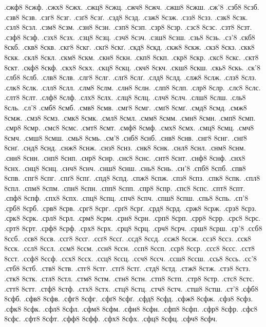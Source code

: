 {.сжф8 8сжф.
.сжх8 8сжх.
.сжц8 8сжц.
.сжч8 8сжч.
.сжш8 8сжш.
.сж'8
.сзб8 8сзб.
.сзв8 8сзв.
.сзг8 8сзг.
.сзґ8 8сзґ.
.сзд8 8сзд.
.сзж8 8сзж.
.сзз8 8сзз.
.сзк8 8сзк.
.сзл8 8сзл.
.сзм8 8сзм.
.сзн8 8сзн.
.сзп8 8сзп.
.сзр8 8сзр.
.сзс8 8сзс.
.сзт8 8сзт.
.сзф8 8сзф.
.сзх8 8сзх.
.сзц8 8сзц.
.сзч8 8сзч.
.сзш8 8сзш.
.сзь8 8сзь.
.сз'8
.скб8 8скб.
.скв8 8скв.
.скг8 8скг.
.скґ8 8скґ.
.скд8 8скд.
.скж8 8скж.
.скз8 8скз.
.скк8 8скк.
.скл8 8скл.
.скм8 8скм.
.скн8 8скн.
.скп8 8скп.
.скр8 8скр.
.скс8 8скс.
.скт8 8скт.
.скф8 8скф.
.скх8 8скх.
.скц8 8скц.
.скч8 8скч.
.скш8 8скш.
.скь8 8скь.
.ск'8
.слб8 8слб.
.слв8 8слв.
.слг8 8слг.
.слґ8 8слґ.
.слд8 8слд.
.слж8 8слж.
.слз8 8слз.
.слк8 8слк.
.слл8 8слл.
.слм8 8слм.
.слн8 8слн.
.слп8 8слп.
.слр8 8слр.
.слс8 8слс.
.слт8 8слт.
.слф8 8слф.
.слх8 8слх.
.слц8 8слц.
.слч8 8слч.
.слш8 8слш.
.сль8 8сль.
.сл'8
.смб8 8смб.
.смв8 8смв.
.смг8 8смг.
.смґ8 8смґ.
.смд8 8смд.
.смж8 8смж.
.смз8 8смз.
.смк8 8смк.
.смл8 8смл.
.смм8 8смм.
.смн8 8смн.
.смп8 8смп.
.смр8 8смр.
.смс8 8смс.
.смт8 8смт.
.смф8 8смф.
.смх8 8смх.
.смц8 8смц.
.смч8 8смч.
.смш8 8смш.
.смь8 8смь.
.см'8
.снб8 8снб.
.снв8 8снв.
.снг8 8снг.
.снґ8 8снґ.
.снд8 8снд.
.снж8 8снж.
.снз8 8снз.
.снк8 8снк.
.снл8 8снл.
.снм8 8снм.
.снн8 8снн.
.снп8 8снп.
.снр8 8снр.
.снс8 8снс.
.снт8 8снт.
.снф8 8снф.
.снх8 8снх.
.снц8 8снц.
.снч8 8снч.
.снш8 8снш.
.снь8 8снь.
.сн'8
.спб8 8спб.
.спв8 8спв.
.спг8 8спг.
.спґ8 8спґ.
.спд8 8спд.
.спж8 8спж.
.спз8 8спз.
.спк8 8спк.
.спл8 8спл.
.спм8 8спм.
.спн8 8спн.
.спп8 8спп.
.спр8 8спр.
.спс8 8спс.
.спт8 8спт.
.спф8 8спф.
.спх8 8спх.
.спц8 8спц.
.спч8 8спч.
.спш8 8спш.
.спь8 8спь.
.сп'8
.срб8 8срб.
.срв8 8срв.
.срг8 8срг.
.срґ8 8срґ.
.срд8 8срд.
.срж8 8срж.
.срз8 8срз.
.срк8 8срк.
.срл8 8срл.
.срм8 8срм.
.срн8 8срн.
.срп8 8срп.
.срр8 8срр.
.срс8 8срс.
.срт8 8срт.
.срф8 8срф.
.срх8 8срх.
.срц8 8срц.
.срч8 8срч.
.срш8 8срш.
.ср'8
.ссб8 8ссб.
.ссв8 8ссв.
.ссг8 8ссг.
.ссґ8 8ссґ.
.ссд8 8ссд.
.ссж8 8ссж.
.ссз8 8ссз.
.сск8 8сск.
.ссл8 8ссл.
.ссм8 8ссм.
.ссн8 8ссн.
.ссп8 8ссп.
.сср8 8сср.
.ссс8 8ссс.
.сст8 8сст.
.ссф8 8ссф.
.ссх8 8ссх.
.ссц8 8ссц.
.ссч8 8ссч.
.ссш8 8ссш.
.ссь8 8ссь.
.сс'8
.стб8 8стб.
.ств8 8ств.
.стг8 8стг.
.стґ8 8стґ.
.стд8 8стд.
.стж8 8стж.
.стз8 8стз.
.стк8 8стк.
.стл8 8стл.
.стм8 8стм.
.стн8 8стн.
.стп8 8стп.
.стр8 8стр.
.стс8 8стс.
.стт8 8стт.
.стф8 8стф.
.стх8 8стх.
.стц8 8стц.
.стч8 8стч.
.стш8 8стш.
.ст'8
.сфб8 8сфб.
.сфв8 8сфв.
.сфг8 8сфг.
.сфґ8 8сфґ.
.сфд8 8сфд.
.сфж8 8сфж.
.сфз8 8сфз.
.сфк8 8сфк.
.сфл8 8сфл.
.сфм8 8сфм.
.сфн8 8сфн.
.сфп8 8сфп.
.сфр8 8сфр.
.сфс8 8сфс.
.сфт8 8сфт.
.сфф8 8сфф.
.сфх8 8сфх.
.сфц8 8сфц.
.сфч8 8сфч.
}
